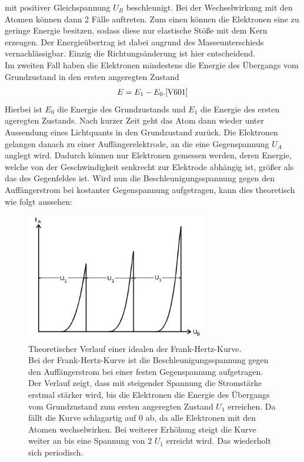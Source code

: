 mit positiver Gleichspannung $U_B$ beschleunigt. Bei der Wechselwirkung mit 
den Atomen können dann 2 Fälle auftreten. Zum einen können die Elektronen eine
zu geringe Energie besitzen, sodass diese nur elastische Stöße mit dem Kern
erzeugen. Der Energieübertrag ist dabei augrund des Masseunterschieds vernachlässigbar.
Einzig die Richtungsänderung ist hier entscheidend.\\
Im zweiten Fall haben die Elektronen mindestens die Energie des Übergangs vom Grundzustand
in den ersten angeregten Zustand
\begin{align}
    E=E_1 -E_0 . \label{eq:2} \text{\cite{V601}}
\end{align}
Hierbei ist $E_0$ die Energie des Grundzustands und $E_1$ die Energie des ersten ageregten Zustands.
Nach kurzer Zeit geht das Atom dann wieder unter Aussendung eines Lichtquants in den Grundzustand zurück.
Die Elektronen gelangen danach zu einer Auffängerelektrode, an die eine Gegenspannung $U_A$ 
anglegt wird. Dadurch können nur Elektronen gemessen werden, deren Energie, welche von der 
Geschwindigkeit senkrecht zur Elektrode abhängig ist, größer als das des Gegenfeldes ist.
Wird nun die Beschleunigungsspannung gegen den Auffängerstrom bei kostanter Gegenspannung
aufgetragen, kann dies theoretisch wie folgt aussehen:
\begin{figure}[H]
    \centering
    \includegraphics[width=0.7\textwidth]{images/kurve.jpg}
    \caption{
        Theoretischer Verlauf einer idealen der Frank-Hertz-Kurve\cite{V601}.\\
        Bei der Frank-Hertz-Kurve ist die Beschleunigungsspannung gegen den
        Auffängerstrom bei einer festen Gegenspannung aufgetragen. Der Verlauf
        zeigt, dass mit steigender Spannung die Stromstärke erstmal stärker wird,
        bis die Elektronen die Energie des Übergangs vom Grundzustand zum ersten angeregten
        Zustand $U_1$ erreichen. Da fällt die Kurve schlagartig auf 0 ab, da alle Elektronen
        mit den Atomen wechselwirken. Bei weiterer Erhöhung steigt die Kurve weiter an
        bis eine Spannung von 2 $U_1$ erreicht wird. Das wiederholt sich periodisch.
    } 
    \label{fig:2}
\end{figure}
